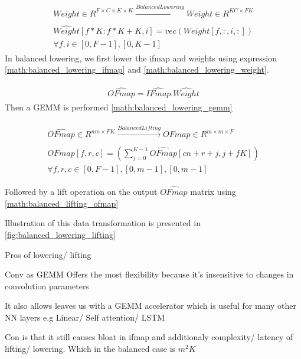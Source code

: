 \begin{align}
    \begin{gathered}
        Weight \in R^{F\times C\times K \times K} \xrightarrow[]{Balanced Lowering} \hat{Weight} \in R^{KC\times FK}\\
        \hat{Weight}[f*K:f*K+K, i] = vec(Weight[f, :, i, :]) \\
        \forall f,i \in [0, F-1], [0, K-1]
    \end{gathered}
    \label{math:balanced_lowering_weight}
\end{align}
In balanced lowering, we first lower the ifmap and weights using expression 
\eqref{math:balanced_lowering_ifmap} and \eqref{math:balanced_lowering_weight}.

\begin{align}
    \begin{gathered}
        \hat{OFmap} = \hat{IFmap}.\hat{Weight}
    \end{gathered}
    \label{math:balanced_lowering_gemm}
\end{align}
Then a \ac{GEMM} is performed \eqref{math:balanced_lowering_gemm}


\begin{align}
    \begin{gathered}
        \hat{OFmap} \in R^{nm\times FK} \xrightarrow[]{Balanced Lifting} OFmap \in  R^{m\times m\times F}\\
        OFmap[f, r, c] = (\displaystyle\sum\limits_{j=0}^{K-1} \hat{OFmap}[cn+r+j, j+fK]) \\
        \forall f,r,c \in [0, F-1], [0, m-1], [0, m-1]
    \end{gathered}
    \label{math:balanced_lifting_ofmap}
\end{align}

Followed by a lift operation on the output $\hat{OFmap}$ matrix using \eqref{math:balanced_lifting_ofmap}

Illustration of this data transformation is presented in \autoref{fig:balanced_lowering_lifting}

Pros of lowering/ lifting

Conv as GEMM Offers the most flexibility because it’s insensitive to changes in
convolution parameters

It also allows leaves us with a GEMM accelerator which is useful for many other
NN layers e.g Linear/ Self attention/ LSTM

Con is that it still causes bloat in ifmap and additionaly complexity/ latency of 
lifting/ lowering. Which in the balanced case is $m^{2}K$ \cite{cafe_con_troll}

